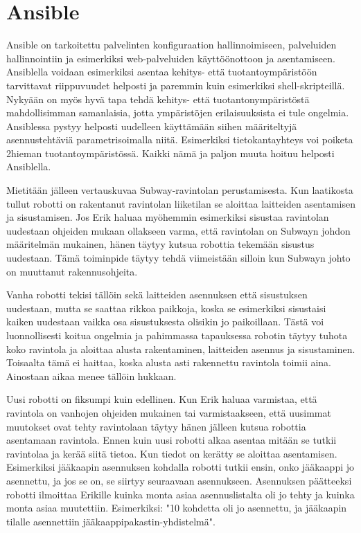 \chapter{Ansible}

Ansible on tarkoitettu palvelinten konfiguraation hallinnoimiseen, palveluiden hallinnointiin ja esimerkiksi web-palveluiden käyttöönottoon ja asentamiseen. Ansiblella voidaan esimerkiksi asentaa kehitys- että tuotantoympäristöön tarvittavat riippuvuudet helposti ja paremmin kuin esimerkiksi shell-skripteillä. Nykyään on myös hyvä tapa tehdä kehitys- että tuotantonympäristöstä mahdollisimman samanlaisia, jotta ympäristöjen erilaisuuksista ei tule ongelmia. Ansiblessa pystyy helposti uudelleen käyttämään siihen määriteltyjä asennustehtäviä parametrisoimalla niitä. Esimerkiksi tietokantayhteys voi poiketa 2hieman tuotantoympäristössä. Kaikki nämä ja paljon muuta hoituu helposti Ansiblella.

Mietitään jälleen vertauskuvaa Subway-ravintolan perustamisesta. Kun laatikosta tullut robotti on rakentanut ravintolan liiketilan se aloittaa laitteiden asentamisen ja sisustamisen. Jos Erik haluaa myöhemmin esimerkiksi sisustaa ravintolan uudestaan ohjeiden mukaan ollakseen varma, että ravintolan on Subwayn johdon määritelmän mukainen, hänen täytyy kutsua robottia tekemään sisustus uudestaan. Tämä toiminpide täytyy tehdä viimeistään silloin kun Subwayn johto on muuttanut rakennusohjeita.

Vanha robotti tekisi tällöin sekä laitteiden asennuksen että sisustuksen uudestaan, mutta se saattaa rikkoa paikkoja, koska se esimerkiksi sisustaisi kaiken uudestaan vaikka osa sisustuksesta olisikin jo paikoillaan. Tästä voi luonnollisesti koitua ongelmia ja pahimmassa tapauksessa robotin täytyy tuhota koko ravintola ja aloittaa alusta rakentaminen, laitteiden asennus ja sisustaminen. Toisaalta tämä ei haittaa, koska alusta asti rakennettu ravintola toimii aina. Ainostaan aikaa menee tällöin hukkaan.

Uusi robotti on fiksumpi kuin edellinen. Kun Erik haluaa varmistaa, että ravintola on vanhojen ohjeiden mukainen tai varmistaakseen, että uusimmat muutokset ovat tehty ravintolaan täytyy hänen jälleen kutsua robottia asentamaan ravintola. Ennen kuin uusi robotti alkaa asentaa mitään se tutkii ravintolaa ja kerää siitä tietoa. Kun tiedot on kerätty se aloittaa asentamisen. Esimerkiksi jääkaapin asennuksen kohdalla robotti tutkii ensin, onko jääkaappi jo asennettu, ja jos se on, se siirtyy seuraavaan asennukseen. Asennuksen päätteeksi robotti ilmoittaa Erikille kuinka monta asiaa asennuslistalta oli jo tehty ja kuinka monta asiaa muutettiin. Esimerkiksi: "10 kohdetta oli jo asennettu, ja jääkaapin tilalle asennettiin jääkaappipakastin-yhdistelmä".

